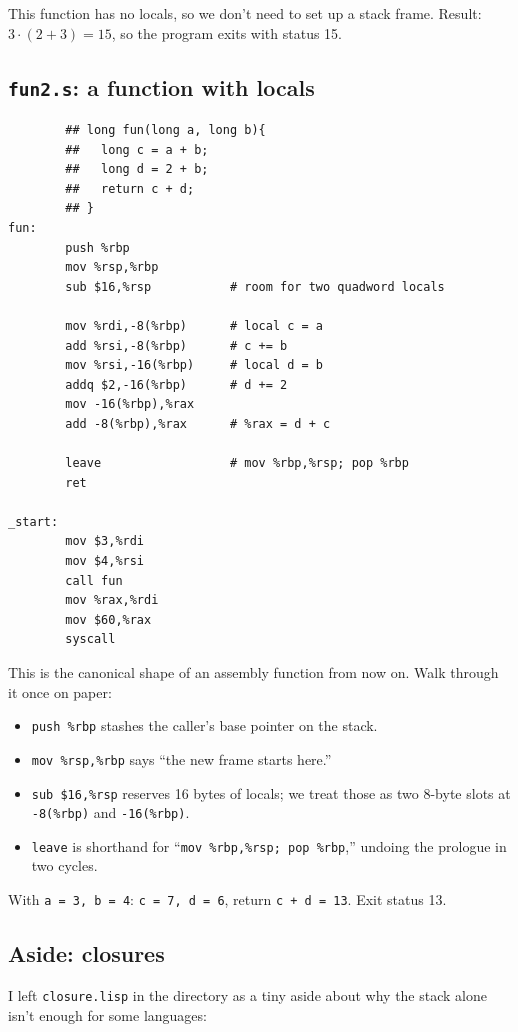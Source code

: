 \documentclass[11pt]{article}
\begin{document}
This function has no locals, so we don't need to set up a stack
frame. Result: $3 \cdot (2 + 3) = 15$, so the program exits with
status 15.

\subsection*{\texttt{fun2.s}: a function with locals}

\begin{lstlisting}
        ## long fun(long a, long b){
        ##   long c = a + b;
        ##   long d = 2 + b;
        ##   return c + d;
        ## }
fun:
        push %rbp
        mov %rsp,%rbp
        sub $16,%rsp           # room for two quadword locals

        mov %rdi,-8(%rbp)      # local c = a
        add %rsi,-8(%rbp)      # c += b
        mov %rsi,-16(%rbp)     # local d = b
        addq $2,-16(%rbp)      # d += 2
        mov -16(%rbp),%rax
        add -8(%rbp),%rax      # %rax = d + c

        leave                  # mov %rbp,%rsp; pop %rbp
        ret

_start:
        mov $3,%rdi
        mov $4,%rsi
        call fun
        mov %rax,%rdi
        mov $60,%rax
        syscall
\end{lstlisting}

This is the canonical shape of an assembly function from now on.
Walk through it once on paper:
\begin{itemize}
  \item \texttt{push \%rbp} stashes the caller's base pointer
    on the stack.
  \item \texttt{mov \%rsp,\%rbp} says ``the new frame starts here.''
  \item \texttt{sub \$16,\%rsp} reserves 16 bytes of locals; we
    treat those as two 8-byte slots at \texttt{-8(\%rbp)} and
    \texttt{-16(\%rbp)}.
  \item \texttt{leave} is shorthand for ``\texttt{mov \%rbp,\%rsp;
    pop \%rbp},'' undoing the prologue in two cycles.
\end{itemize}

With \texttt{a = 3, b = 4}: \texttt{c = 7, d = 6}, return \texttt{c
+ d = 13}. Exit status 13.

\subsection*{Aside: closures}

I left \texttt{closure.lisp} in the directory as a tiny aside about
why the stack alone isn't enough for some languages:
\end{document}
